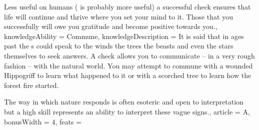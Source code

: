 {Less useful on humans ( is probably more useful)\comma{} a successful  check ensures that life will continue and thrive where you set your mind to it. Those that you successfully  will owe you gratitude and become positive towards you.,
	knowledgeAbility = Commune,
	knowledgeDescription = It is said that\comma{} in ages past\comma{} the \bname{}s could speak to the winds\comma{} the trees\comma{} the beasts and even the stars themselves to seek answers. A  check allows you to communicate – in a very rough fashion – with the natural world. You may attempt to commune with a wounded Hippogriff to learn what happened to it\comma{} or with a scorched tree to learn how the forest fire started. 

The way in which nature responds is often esoteric and open to interpretation\comma{} but a high  skill represents an ability to interpret these vague signs.,
	article = A,
	bonusWidth = 4, feats = \DruidFeats
}

